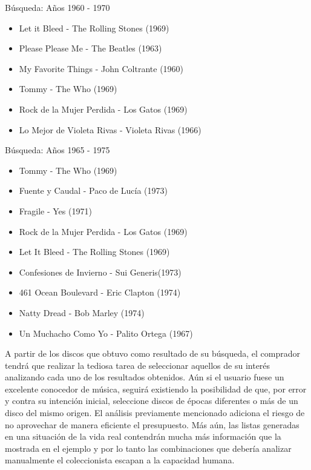 \begin{mybox}{Búsqueda: Años 1960 - 1970}
\begin{itemize}
	\item {\scriptsize Let it Bleed - The Rolling Stones (1969)}
	\item {\scriptsize Please Please Me - The Beatles (1963)}
	\item {\scriptsize My Favorite Things - John Coltrante (1960)}
	\item {\scriptsize Tommy - The Who (1969)}
	\item {\scriptsize Rock de la Mujer Perdida - Los Gatos (1969)}
	\item {\scriptsize Lo Mejor de Violeta Rivas - Violeta Rivas (1966)}
\end{itemize}
\end{mybox}

\begin{mybox}{Búsqueda: Años 1965 - 1975}
\begin{itemize}
	\item {\scriptsize Tommy - The Who (1969)}
	\item {\scriptsize Fuente y Caudal - Paco de Lucía (1973)}
	\item {\scriptsize Fragile - Yes (1971)}
	\item {\scriptsize Rock de la Mujer Perdida - Los Gatos (1969)}
	\item {\scriptsize Let It Bleed - The Rolling Stones (1969)}
	\item {\scriptsize Confesiones de Invierno - Sui Generis(1973)}
	\item {\scriptsize 461 Ocean Boulevard - Eric Clapton (1974)}
	\item {\scriptsize Natty Dread - Bob Marley (1974)}
	\item {\scriptsize Un Muchacho Como Yo - Palito Ortega (1967)}
\end{itemize}
\end{mybox}

A partir de los discos que obtuvo como resultado de su búsqueda, el comprador tendrá que realizar la tediosa tarea de seleccionar aquellos de su interés analizando cada uno de los resultados obtenidos. Aún si el usuario fuese un excelente conocedor de música, seguirá existiendo la posibilidad de que, por error y contra su intención inicial, seleccione discos de épocas diferentes o más de un disco del mismo origen. El análisis previamente mencionado adiciona el riesgo de no aprovechar de manera eficiente el presupuesto. Más aún, las listas generadas en una situación de la vida real contendrán mucha más información que la mostrada en el ejemplo y por lo tanto las combinaciones que debería analizar manualmente el coleccionista escapan a la capacidad humana. 

